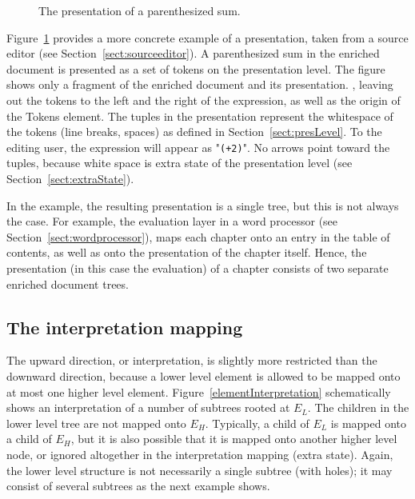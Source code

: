 \begin{figure}
\begin{center}
\begin{center}
%
%
\end{center}
\caption{The presentation of a parenthesized sum.}\label{presentExample} 
\end{center}
\end{figure}

Figure~\ref{presentExample} provides a more concrete example of a presentation, taken from a source editor (see Section~\ref{sect:sourceeditor}). A parenthesized sum in the enriched document is presented as a set of tokens on the presentation level. The figure shows only a fragment of the enriched document and its presentation. \bc , leaving out the tokens to the left and the right of the expression, as well as the origin of the Tokens element. \ec The tuples in the presentation represent the whitespace of the tokens (line breaks, spaces) as defined in Section~\ref{sect:presLevel}. To the editing user, the expression will appear as "{\tt (+2\textvisiblespace )}". No arrows point toward the tuples, because white space is extra state of the presentation level (see Section~\ref{sect:extraState}). 

\bc
In the example, the resulting presentation is a single tree, but this is not always the case. For example, the evaluation layer in a word processor (see Section~\ref{sect:wordprocessor}), maps each chapter onto an entry in the table of contents, as well as onto the presentation of the chapter itself. Hence, the presentation (in this case the evaluation) of a chapter consists of two separate enriched document trees.
\ec



%																
\subsection{The interpretation mapping}

The upward direction, or interpretation, is slightly more restricted than the downward direction, because a lower level element is allowed to be mapped onto at most one higher level element.  Figure~\ref{elementInterpretation} schematically shows an interpretation of a number of subtrees rooted at $E_L$. The children in the lower level tree are not mapped onto $E_H$. Typically, a child of $E_L$ is mapped onto a child of $E_H$, but it is also possible that it is mapped onto another higher level node, or ignored altogether in the interpretation mapping (extra state).  Again, the lower level structure is not necessarily a single subtree (with holes); it may consist of several subtrees as the next example shows.

